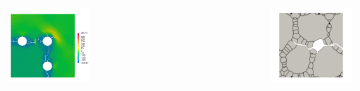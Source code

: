 \begin{frame}
\begin{columns}[T]
\begin{column}{0.2\textwidth}
\begin{figure}
\begin{subfigure}{0.94\linewidth}
        \end{subfigure}
        \begin{subfigure}{0.94\linewidth}
          \centering
          \includegraphics[width=0.9\linewidth]{Chapter345/figures/three_bubbles_stress}
        \end{subfigure}
      \end{figure}
    \end{column}
    \begin{column}{0.4\textwidth}
      \vspace{-1em}
      \begin{figure}
        \centering
        \begin{subfigure}[t]{0.47\linewidth}
          \centering
          \includegraphics[width=0.9\linewidth]{Chapter345/figures/partial_hbs_1}

\end{subfigure}
\end{figure}
\end{column}
\end{columns}
\end{frame}
